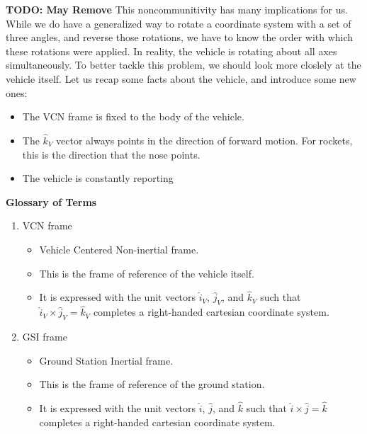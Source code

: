 \documentclass[12pt, letterpaper]{article}
\begin{document}
\textbf{TODO: May Remove}
This noncommunitivity has many implications for us. While we do have a generalized way to rotate a coordinate system with a set of three angles, and reverse those rotations, we have to know the order with which these rotations were applied. In reality, the vehicle is rotating about all axes simultaneously. To better tackle this problem, we should look more closlely at the vehicle itself. Let us recap some facts about the vehicle, and introduce some new ones:
\begin{itemize}
\item The VCN frame is fixed to the body of the vehicle. 
\item The $\hat{k}_V$ vector always points in the direction of forward motion. For rockets, this is the direction that the nose points.
\item The vehicle is constantly reporting 
\end{itemize}

\pagebreak
\begin{center}
\textbf{Glossary of Terms}
\end{center}
\begin{enumerate}
\item VCN frame
\begin{itemize}
\item Vehicle Centered Non-inertial frame.
\item This is the frame of reference of the vehicle itself.
\item It is expressed with the unit vectors $\hat{i}_V$, $\hat{j}_V$, and $\hat{k}_V$ such that \\ $\hat{i}_V \times \hat{j}_V = \hat{k}_V$ completes a right-handed cartesian coordinate system.
\end{itemize}

\item GSI frame
\begin{itemize}
\item Ground Station Inertial frame.
\item This is the frame of reference of the ground station.
\item It is expressed with the unit vectors $\hat{i}$, $\hat{j}$, and $\hat{k}$ such that $\hat{i} \times \hat{j} = \hat{k}$ completes a right-handed cartesian coordinate system.
\end{itemize}
\end{enumerate}
\end{document}
